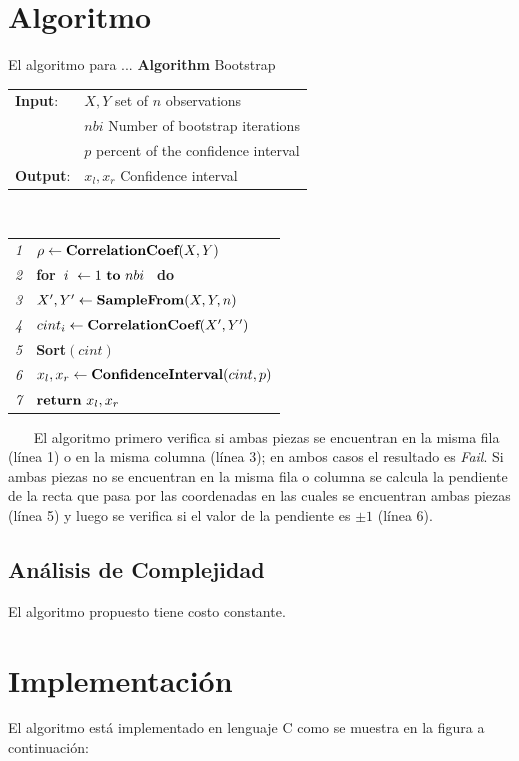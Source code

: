\documentclass{report}
\newcommand \minitab{\hspace*{15 pt}}
\begin{document}
\section{Algoritmo}
El algoritmo para ...
\newline
\newline
{\bf Algorithm} Bootstrap
\newline
\newline
\begin{tabular}{l l}
{\bf Input}:  & $X, Y$ set of $n$ observations \\ 
              & $nbi$ Number of bootstrap iterations \\ 
              & $p$ percent of the confidence interval \\
{\bf Output}: & $x_l, x_r$ Confidence interval  \\
\end{tabular}
~~
\newline
\begin{tabular}{>{\em}r l}
\\
1 & $\rho \leftarrow \mbox{\bf CorrelationCoef}(X,Y)$ \\
2 & {\bf for}~$i~\leftarrow 1~ \mbox{\bf to}~ nbi$~ {\bf do} \\
3 & \minitab $X',Y' \leftarrow \mbox{\bf SampleFrom}(X,Y,n)$ \\
4 & \minitab $cint_i \leftarrow \mbox{\bf CorrelationCoef}(X',Y')$ \\
5 & {\bf Sort}$(cint)$ \\
6 & $x_l,x_r \leftarrow \mbox{\bf ConfidenceInterval}(cint,p)$ \\
7 & $\mbox{\bf return}~x_l,x_r$
\end{tabular}
~~~
\newline
\newline
El algoritmo primero verifica si ambas piezas se encuentran en la misma fila (l\'inea 1) o en la misma columna
(l\'inea 3); en ambos casos el resultado es {\em Fail}. 
\newline
Si ambas piezas no se encuentran en la misma fila o columna se calcula la pendiente de la recta que pasa por las coordenadas
en las cuales se encuentran ambas piezas (l\'inea 5) y luego se verifica si el valor de la pendiente es $\pm 1$ 
(l\'inea 6).
%
\subsection{An\'alisis de Complejidad}
El algoritmo propuesto tiene costo constante.
%
\section{Implementaci\'on}
El algoritmo est\'a implementado en lenguaje C como se muestra en la figura a continuaci\'on:
\newpage
%
\end{document}
